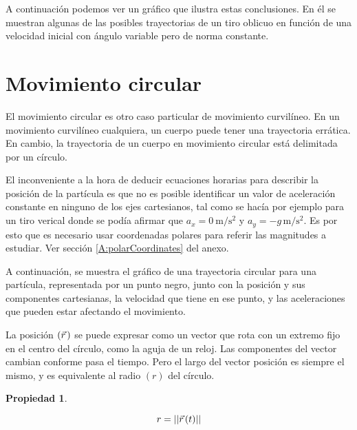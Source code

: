 \documentclass[a5paper,12pt,twoside]{book}
\newtheorem{prop}{{Propiedad}}[chapter]
\begin{document}
A continuación podemos ver un gráfico que ilustra estas conclusiones. En él se muestran algunas de las posibles trayectorias de un tiro oblicuo en función de una velocidad inicial con ángulo variable pero de norma constante.

\begin{center}
    \def\svgwidth{\linewidth}
    
\end{center}


\section{Movimiento circular}
\label{sec:circularMotion}

El movimiento circular es otro caso particular de movimiento curvilíneo. En un movimiento curvilíneo cualquiera, un cuerpo puede tener una trayectoria errática. En cambio, la trayectoria de un cuerpo en movimiento circular está delimitada por un círculo.

El inconveniente a la hora de deducir ecuaciones horarias para describir la posición de la partícula es que no es posible identificar un valor de aceleración constante en ninguno de los ejes cartesianos, tal como se hacía por ejemplo para un tiro verical donde se podía afirmar que $a_x=\SI{0}{\metre\per\second^2}$ y $a_y=-g\,\si{\metre\per\second^2}$. Es por esto que es necesario usar {coordenadas polares} para referir las magnitudes a estudiar. Ver sección \ref{A:polarCoordinates} del anexo.

A continuación, se muestra el gráfico de una trayectoria circular para una partícula, representada por un punto negro, junto con la posición y sus componentes cartesianas, la velocidad que tiene en ese punto, y las aceleraciones que pueden estar afectando el movimiento.

\begin{center}
    \def\svgwidth{\linewidth}
    
\end{center}

La posición $(\vec{r}\hspace{0.05cm})$ se puede expresar como un vector que rota con un extremo fijo en el centro del círculo, como la aguja de un reloj. Las componentes del vector cambian conforme pasa el tiempo. Pero el largo del vector posición es siempre el mismo, y es equivalente al radio $(r)$ del círculo.

\begin{mdframed}[style=MyFrame1]
    \begin{prop}
        \label{prop:circularMovRadius}
    \end{prop}
    \begin{equation*}
        r = {\left|\left| {\vec{r}\hspace{0.05cm}(t)} \right|\right|}
    \end{equation*}
\end{mdframed}
\end{document}

